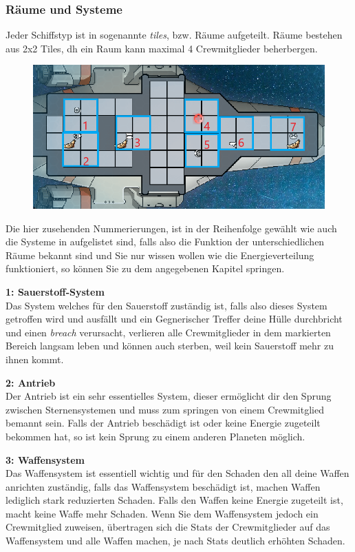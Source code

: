 \documentclass[fontsize=12pt,paper=a4,twoside]{scrartcl}
\begin{document}
\subsubsection{Räume und Systeme} 
\label{sec:Systeme}
Jeder Schiffstyp ist in sogenannte \textit{tiles}, bzw. Räume aufgeteilt. Räume bestehen aus 2x2 Tiles, dh ein Raum kann maximal 4 Crewmitglieder beherbergen.

\begin{figure}[H]
\centering
\includegraphics[width=1\linewidth]{DasSpiel/Ui/tiles.png}
\end{figure}

Die hier zusehenden Nummerierungen, ist in der Reihenfolge gewählt wie auch die Systeme in  aufgelistet sind, falls also die Funktion der unterschiedlichen Räume bekannt sind und Sie nur wissen wollen wie die Energieverteilung funktioniert, so können Sie zu dem angegebenen Kapitel springen.

\textbf{1: Sauerstoff-System}
\\
Das System welches für den Sauerstoff zuständig ist, falls also dieses System getroffen wird und ausfällt und ein Gegnerischer Treffer deine Hülle durchbricht und einen \textit{breach} verursacht, verlieren alle Crewmitglieder in dem markierten Bereich langsam leben und können auch sterben, weil kein Sauerstoff mehr zu ihnen kommt.

\textbf{2: Antrieb}
\\
Der Antrieb ist ein sehr essentielles System, dieser ermöglicht dir den Sprung zwischen Sternensystemen und muss zum springen von einem Crewmitglied bemannt sein. Falls der Antrieb beschädigt ist oder keine Energie zugeteilt bekommen hat, so ist kein Sprung zu einem anderen Planeten möglich.

\textbf{3: Waffensystem}
\\
Das Waffensystem ist essentiell wichtig und für den Schaden den all deine Waffen anrichten zuständig, falls das Waffensystem beschädigt ist, machen Waffen lediglich stark reduzierten Schaden. Falls den Waffen keine Energie zugeteilt ist, macht keine Waffe mehr Schaden. Wenn Sie dem Waffensystem jedoch ein Crewmitglied zuweisen, übertragen sich die Stats der Crewmitglieder auf das Waffensystem und alle Waffen machen, je nach Stats deutlich erhöhten Schaden.
\end{document}
